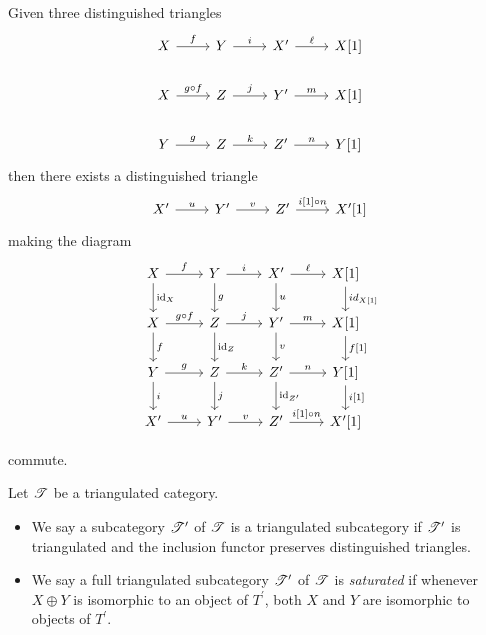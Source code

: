 \documentclass[dissertation.tex]{subfiles}
\begin{document}
\begin{defn}
\begin{description}[style=nextline]
    \item[TR4]\label{TR4}
      Given three distinguished triangles
      $$\begin{tikzcd}
        X \arrow{r}{f} & Y \arrow{r}{i} & X^\prime \arrow{r}{\ell} & X[1]\\
        X \arrow{r}{g \circ f} & Z \arrow{r}{j} & Y^\prime \arrow{r}{m} & X[1]\\
        Y \arrow{r}{g} & Z \arrow{r}{k} & Z^\prime \arrow{r}{n} & Y[1]
      \end{tikzcd}$$
      then there exists a distinguished triangle
      $$\begin{tikzcd}
        X^\prime \arrow{r}{u} & Y^\prime \arrow{r}{v} & Z^\prime \arrow{r}{i[1]\circ n} & X^\prime[1]
      \end{tikzcd}$$
      making the diagram
      $$\begin{tikzcd}
        X\arrow{d}{\id_X}\arrow{r}{f} & Y\arrow{r}{i}\arrow{d}{g} & X^\prime\arrow{r}{\ell}\arrow{d}{u} & X[1]\arrow{d}{id_{X[1]}}\\
        X \arrow{d}{f}\arrow{r}{g \circ f} & Z\arrow{r}{j}\arrow{d}{\id_Z} & Y^\prime\arrow{r}{m}\arrow{d}{v} & X[1]\arrow{d}{f[1]}\\
        Y\arrow{r}{g}\arrow{d}{i} & Z \arrow{r}{k}\arrow{d}{j} & Z^\prime \arrow{r}{n}\arrow{d}{\id_{Z^\prime}} & Y[1]\arrow{d}{i[1]}\\
        X^\prime \arrow{r}{u} & Y^\prime \arrow{r}{v} & Z^\prime \arrow{r}{i[1] \circ n} & X^\prime[1]
      \end{tikzcd}$$
  \end{description}
\end{defn}
commute.

\begin{defn}
  Let $\mathscr{T}$ be a triangulated category.
  \begin{itemize}
  \item
    We say a subcategory $\mathscr{T}^\prime$ of $\mathscr{T}$ is a triangulated subcategory if $\mathscr{T}^\prime$ is triangulated and the inclusion functor preserves distinguished triangles.
  \item
    We say a full triangulated subcategory $\mathscr{T}^\prime$ of $\mathscr{T}$ is {\it saturated} if whenever $X \oplus Y$ is isomorphic to an object of $T^\prime$, both $X$ and $Y$ are isomorphic to objects of $T^\prime$.
  \end{itemize}
\end{defn}
\end{document}
